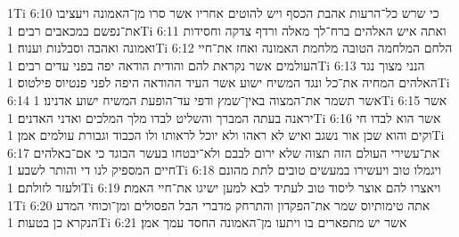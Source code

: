1Ti 6:10  כי שרש כל־הרעות אהבת הכסף ויש להוטים אחריו אשר סרו מן־האמונה ויעציבו את־נפשם במכאבים רבים׃
1Ti 6:11  ואתה איש האלהים ברח־לך מאלה ורדף צדקה וחסידות ואמונה ואהבה וסבלנות וענוה׃
1Ti 6:12  הלחם המלחמה הטובה מלחמת האמונה ואחז את־חיי העולמים אשר נקראת להם והודית הודאה יפה בפני עדים רבים׃
1Ti 6:13  הנני מצוך נגד האלהים המחיה את־כל ונגד המשיח ישוע אשר העיד ההודאה היפה לפני פנטיוס פילטוס׃
1Ti 6:14  אשר תשמר את־המצוה באין־שמץ ודפי עד־הופעת המשיח ישוע אדנינו׃
1Ti 6:15  אשר יראנה בעתה המברך והשליט לבדו מלך המלכים ואדני האדנים׃
1Ti 6:16  אשר הוא לבדו חי וקים והוא שכן אור נשגב ואיש לא ראהו ולא יוכל לראותו ולו הכבוד וגבורת עולמים אמן׃
1Ti 6:17  את־עשירי העולם הזה תצוה שלא ירום לבבם ולא־יבטחו בעשר הבוגד כי אם־באלהים חיים המספיק לנו די והותר לשבע׃
1Ti 6:18  ויגמלו טוב ויעשירו במעשים טובים לתת מהונם ולעזר לזולתם׃
1Ti 6:19  ויאצרו להם אוצר ליסוד טוב לעתיד לבא למען ישיגו את־חיי האמת׃
1Ti 6:20  אתה טימותיוס שמר את־הפקדון והתרחק מדברי הבל הפסולים ומן־וכוחי המדע הנקרא כן בטעות׃
1Ti 6:21  אשר יש מתפארים בו ויתעו מן־האמונה החסד עמך אמן׃


